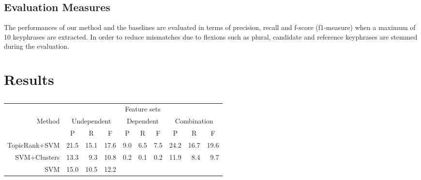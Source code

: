  \subsection{Evaluation Measures}
  \label{subsec:evaluation_measures}
    The performances of our method and the baselines are evaluated in terms of
    precision, recall and f-score (f1-measure) when a maximum of 10 keyphrases
    are extracted. In order to reduce mismatches due to flexions such as plural,
    candidate and reference keyphrases are stemmed during the evaluation.

\section{Results}
\label{sec:results}

  \begin{table*}
    \centering
    \begin{tabular}{rrrrrrrrrr}
      \toprule
      & \multicolumn{9}{c}{Feature sets}\\
      \cmidrule{2-10}
      Method & \multicolumn{3}{c}{Undependent} & \multicolumn{3}{c}{Dependent} & \multicolumn{3}{c}{Combination}\\
      \cmidrule(r){2-4}
      \cmidrule{5-7}
      \cmidrule(l){8-10}
      & \multicolumn{1}{c}{P} & \multicolumn{1}{c}{R} & \multicolumn{1}{c}{F} & \multicolumn{1}{c}{P} & \multicolumn{1}{c}{R} & \multicolumn{1}{c}{F} & \multicolumn{1}{c}{P} & \multicolumn{1}{c}{R} & \multicolumn{1}{c}{F}\\
      \midrule
      TopicRank+SVM & 21.5 & 15.1 & 17.6
                    & 9.0 & 6.5 & 7.5
                    & 24.2 & 16.7 & 19.6\\
      SVM+Clusters  & 13.3 & 9.3 & 10.8
                    & 0.2 & 0.1 & 0.2
                    & 11.9 & 8.4 & 9.7\\
      SVM           & 15.0 & 10.5 & 12.2
                    &  &  & 
                    &  &  & \\
      \bottomrule
    \end{tabular}
    \caption{
             \label{tab:baseline_comparison}}
  \end{table*}

